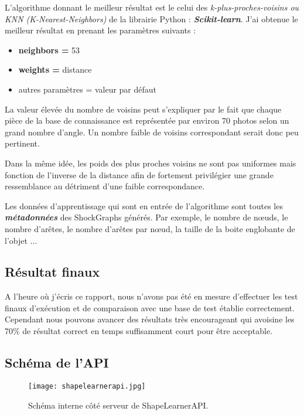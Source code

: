 L'algorithme donnant le meilleur résultat est le celui des \textit{k-plus-proches-voisins ou KNN (K-Nearest-Neighbors)} de la librairie Python : \textbf{\textit{Scikit-learn}}. J'ai obtenue le meilleur résultat en prenant les paramètres suivants :

\begin{itemize}
	\item \textbf{neighbors =}  53
	\item \textbf{weights =}  distance
	\item autres paramètres = valeur par défaut
\end{itemize}

La valeur élevée du nombre de voisins peut s'expliquer par le fait que chaque pièce de la base de connaissance est représentée par environ 70 photos selon un grand nombre d'angle. Un nombre faible de voisins correspondant serait donc peu pertinent.

Dans la même idée, les poids des plus proches voisins ne sont pas uniformes mais fonction de l'inverse de la distance afin de fortement privilégier une grande ressemblance au détriment d'une faible correspondance.

Les données d'apprentissage qui sont en entrée de l'algorithme sont toutes les \textit{\textbf{métadonnées}} des ShockGraphs générés. Par exemple, le nombre de nœuds, le nombre d'arêtes, le nombre d'arêtes par nœud, la taille de la boite englobante de l'objet ...

\subsection{Résultat finaux}

A l'heure où j'écris ce rapport, nous n'avons pas été en mesure d'effectuer les test finaux d'exécution et de comparaison avec une base de test établie correctement. Cependant nous pouvons avancer des résultats très encourageant qui avoisine les 70\% de résultat correct en temps suffisamment court pour être acceptable.

\subsection{Schéma de l'API}

 \begin{figure}[H]
    \centering
    \texttt{[image: shapelearnerapi.jpg]}
	\caption{Schéma interne côté serveur de ShapeLearnerAPI.}\label{image.ShapeAPIScheme} 
\end{figure}

\clearpage